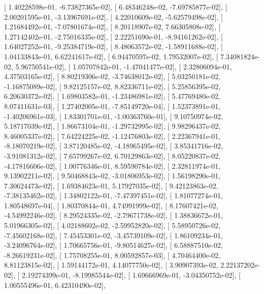 \documentclass{article}
\begin{document}
       [  1.40228598e-01,  -6.73827365e-02],
       [  6.48346248e-02,  -7.69785877e-02],
       [  2.00201595e-01,  -3.13967691e-02],
       [  4.22010609e-02,  -5.62579498e-02],
       [  1.21684492e-01,  -7.07801674e-02],
       [  8.20118907e-02,   7.66305808e-02],
       [  1.27142402e-01,  -2.75016335e-02],
       [  2.22251690e-01,  -8.94161262e-02],
       [  1.64027252e-01,  -9.25384719e-02],
       [  8.48063572e-02,  -1.58911688e-02],
       [  1.04133843e-01,   6.62241617e-02],
       [  6.94470597e-02,   1.79532007e-02],
       [  7.34081824e-02,   5.96750541e-02],
       [  1.05707842e-01,  -1.47041477e-02],
       [  2.32806094e-01,   4.37503165e-02],
       [  8.80219306e-02,  -3.74638012e-02],
       [  5.03250181e-02,  -1.16875089e-02],
       [  9.82125157e-02,   8.82336711e-02],
       [  5.25856395e-02,   6.20630372e-02],
       [  1.69803582e-01,  -1.23486981e-02],
       [  5.47769480e-02,   8.07411631e-03],
       [  1.27402005e-01,  -7.85149720e-04],
       [  1.52373891e-01,  -1.40206961e-03],
       [  1.83301701e-01,  -1.00363760e-01],
       [  9.10750974e-02,   5.18717039e-02],
       [  1.86673104e-01,  -1.29732995e-02],
       [  9.98296437e-02,   8.46005337e-02],
       [  7.64224225e-02,  -1.12476803e-02],
       [  2.22367941e-01,  -8.18070219e-02],
       [  3.87120485e-02,  -4.18965495e-02],
       [  3.85341716e-02,  -3.91081312e-02],
       [  7.65799267e-02,   6.70129863e-02],
       [  8.05220837e-02,  -4.17816606e-02],
       [  1.00776346e-01,   8.59590784e-02],
       [  2.32811974e-01,   9.13902211e-02],
       [  9.50468843e-02,  -3.01806953e-02],
       [  1.56198290e-01,   7.30624473e-02],
       [  1.69384623e-01,   5.17927035e-02],
       [  9.42123863e-02,  -7.38135462e-02],
       [  1.34802122e-01,  -7.47397451e-02],
       [  1.81077274e-01,   1.80548697e-04],
       [  1.80370844e-01,   4.74991999e-02],
       [  8.17607421e-02,  -4.54992246e-02],
       [  8.29524335e-02,  -2.79671738e-02],
       [  1.38836672e-01,   5.01966305e-02],
       [  4.02188602e-02,  -2.59952820e-02],
       [  5.58950726e-02,  -7.45602168e-02],
       [  7.45453301e-02,  -3.45739109e-02],
       [  1.86109234e-01,  -3.24096764e-02],
       [  1.70665756e-01,  -9.80514627e-02],
       [  6.58887510e-02,  -8.26619231e-02],
       [  1.75708255e-01,   8.00592857e-03],
       [  4.70464400e-02,   8.81123815e-02],
       [  1.59144172e-01,   4.14077750e-02],
       [  3.90907393e-02,   2.22137202e-02],
       [  2.19274399e-01,  -8.19985544e-02],
       [  1.69666969e-01,  -3.04350752e-02],
       [  1.00555496e-01,   6.42310490e-02],
\end{document}
